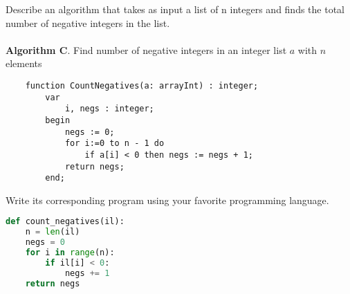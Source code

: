 \documentclass[12pt]{article}
\newenvironment{problem}[2][Problem]{\begin{trivlist}
\item[\hskip \labelsep {\bfseries #1}\hskip \labelsep {\bfseries #2.}]}{\end{trivlist}}
\begin{document}
\begin{problem}{3}
Describe an algorithm that takes as input a list of n integers and finds the total number
of negative integers in the list.
\\\\
\textbf{Algorithm C}. Find number of negative integers in an integer list $a$ with $n$ elements
\begin{verbatim}
    function CountNegatives(a: arrayInt) : integer;
        var
            i, negs : integer;
        begin
            negs := 0;
            for i:=0 to n - 1 do
                if a[i] < 0 then negs := negs + 1;
            return negs;
        end;
\end{verbatim}
Write its corresponding program using your favorite programming language.\\

\begin{lstlisting}[language=Python, caption=Count Negatives]
def count_negatives(il):
    n = len(il)
    negs = 0
    for i in range(n):
        if il[i] < 0:
            negs += 1
    return negs

\end{lstlisting}


\end{problem}
 
 
\end{document}
